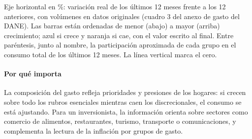 \begin{leer}
Eje horizontal en \%: variación real de los últimos 12 meses frente a los 12 anteriores, con volúmenes en datos originales (cuadro 3 del anexo de gasto del DANE). Las barras están ordenadas de menor (abajo) a mayor (arriba) crecimiento; azul si crece y naranja si cae, con el valor escrito al final. Entre paréntesis, junto al nombre, la participación aproximada de cada grupo en el consumo total de los últimos 12 meses. La línea vertical marca el cero.
\end{leer}

\paragraph{Por qué importa}
La composición del gasto refleja prioridades y presiones de los hogares: si crecen sobre todo los rubros esenciales mientras caen los discrecionales, el consumo se está ajustando. Para un inversionista, la información orienta sobre sectores como comercio de alimentos, restaurantes, turismo, transporte o comunicaciones, y complementa la lectura de la inflación por grupos de gasto.

